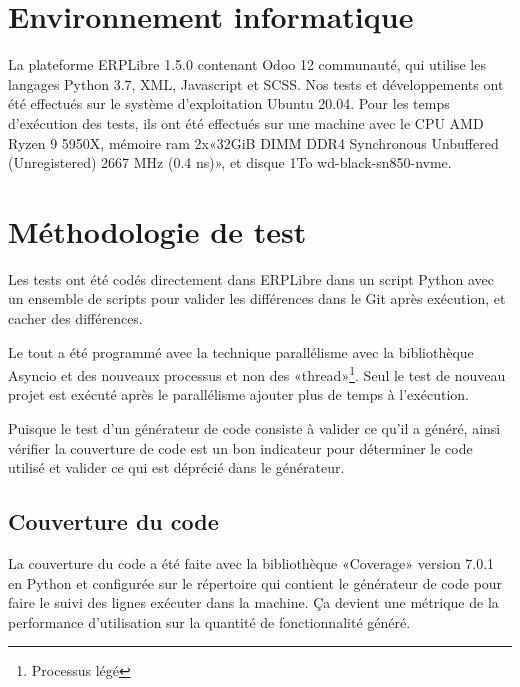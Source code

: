 \section{Environnement informatique}
La plateforme ERPLibre 1.5.0 contenant Odoo 12 communauté, qui utilise les langages Python 3.7, XML, Javascript et SCSS. Nos tests et développements ont été effectués sur le système d’exploitation Ubuntu 20.04.
Pour les temps d’exécution des tests, ils ont été effectués sur une machine avec le CPU AMD Ryzen 9 5950X, mémoire ram 2x«32GiB DIMM DDR4 Synchronous Unbuffered (Unregistered) 2667 MHz (0.4 ns)», et disque 1To wd-black-sn850-nvme.


\section{Méthodologie de test}
Les tests ont été codés directement dans ERPLibre dans un script Python avec un ensemble de scripts pour valider les différences dans le Git après exécution, et cacher des différences.

Le tout a été programmé avec la technique parallélisme avec la bibliothèque Asyncio et des nouveaux processus et non des «thread»\footnote{Processus légé}. Seul le test de nouveau projet est exécuté après le parallélisme ajouter plus de temps à l’exécution.

Puisque le test d’un générateur de code consiste à valider ce qu’il a généré, ainsi vérifier la couverture de code est un bon indicateur pour déterminer le code utilisé et valider ce qui est déprécié dans le générateur.

\subsection{Couverture du code}
La couverture du code a été faite avec la bibliothèque «Coverage» version 7.0.1 en Python et configurée sur le répertoire qui contient le générateur de code pour faire le suivi des lignes exécuter dans la machine. Ça devient une métrique de la performance d’utilisation sur la quantité de fonctionnalité généré.
